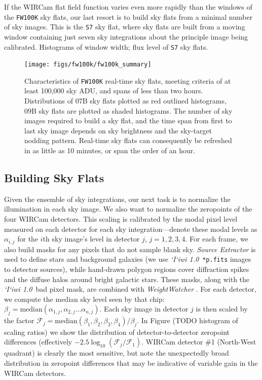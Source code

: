 \documentclass[iop]{emulateapj}
\newcommand{\sw}[1]{\textit{#1}} %
\newcommand{\iiwione}{\sw{`I`iwi 1.0}}
\newcommand{\todo}[1]{\textcolor{RedOrange}{#1}} %
\begin{document}
If the WIRCam flat field function varies even more rapidly than the windows of the \texttt{FW100K} sky flats, our last resort is to build sky flats from a minimal number of sky images.
This is the \texttt{S7} sky flat, where sky flats are built from a moving window containing just seven sky integrations about the principle image being calibrated.
\todo{Histograms of window width; flux level of \texttt{S7} sky flats}.

\begin{figure}[t]
\centering
\texttt{[image: figs/fw100k/fw100k\_summary]}
\caption{
  Characteristics of \texttt{FW100K} real-time sky flats, meeting criteria of at least 100,000 sky ADU, and spans of less than two hours.
Distributions of 07B sky flats plotted as red outlined histograms, 09B sky flats are plotted as shaded histograms.
The number of sky images required to build a sky flat, and the time span from first to last sky image depends on sky brightness and the sky-target nodding pattern.
Real-time sky flats can consequently be refreshed in as little as 10 minutes, or span the order of an hour.
}
\label{fig:fw100k_summary}
\end{figure}

\subsection{Building Sky Flats}
\label{sec:flatbuilding}

Given the ensemble of sky integrations, our next task is to normalize the illumination in each sky image.
We also want to normalize the zeropoints of the four WIRCam detectors.
This scaling is calibrated by the modal pixel level measured on each detector for each sky integration---denote these modal levels as $\alpha_{i,j}$ for the $i$th sky image's level in detector $j$, $j=1, 2, 3, 4$.
For each frame, we also build masks for any pixels that do not sample blank sky. \sw{Source Extractor} \citep{Bertin:1996} is used to define stars and background galaxies (we use \iiwione\ \texttt{*p.fits} images to detector sources), while hand-drawn polygon regions cover diffraction spikes and the diffuse halos around bright galactic stars. These masks, along with the \iiwione\ bad pixel mask, are combined with \sw{WeightWatcher} \citep{Marmo:2008}.
For each detector, we compute the median sky level seen by that chip: $\beta_j = \mathrm{median}(\alpha_{1,j}, \alpha_{2,j}\ldots \alpha_{n,j} )$.
Each sky image in detector $j$ is then scaled by the factor $\mathcal{F}_j = \mathrm{median}(\beta_1, \beta_2, \beta_3, \beta_4) / \beta_j$.
In Figure (\todo{TODO histogram of scaling ratios}) we show the distribution of detector-to-detector zeropoint differences (effectively $-2.5 \log_{10}(\mathcal{F}_j / \mathcal{F}_1)$.
WIRCam detector \#1 (North-West quadrant) is clearly the most sensitive, but note the unexpectedly broad distribution in zeropoint differences that may be indicative of variable gain in the WIRCam detectors.
\end{document}
